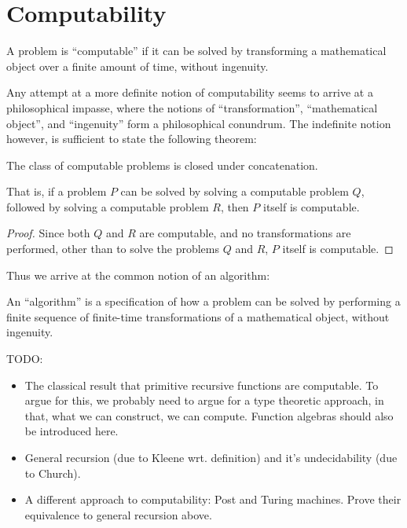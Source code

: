 
\chapter{Computability}

\begin{notion} A problem is ``computable'' if it can be solved by transforming
a mathematical object over a finite amount of time, without ingenuity.
\end{notion}

Any attempt at a more definite notion of computability seems to arrive at a
philosophical impasse, where the notions of ``transformation'', ``mathematical
object'', and ``ingenuity'' form a philosophical conundrum. The indefinite
notion however, is sufficient to state the following theorem:

\begin{theorem} The class of computable problems is closed under
concatenation.\end{theorem}

That is, if a problem $P$ can be solved by solving a computable problem $Q$,
followed by solving a computable problem $R$, then $P$ itself is computable.

\begin{proof} Since both $Q$ and $R$ are computable, and no transformations are
performed, other than to solve the problems $Q$ and $R$, $P$ itself is
computable.\end{proof}

Thus we arrive at the common notion of an algorithm:

\begin{notion} An ``algorithm'' is a specification of how a problem can be
solved by performing a finite sequence of finite-time transformations of a
mathematical object, without ingenuity. \end{notion}

TODO:

\begin{itemize}

\item The classical result that primitive recursive functions are computable.
To argue for this, we probably need to argue for a type theoretic approach, in
that, what we can construct, we can compute. Function algebras should also be
introduced here.

\item General recursion (due to Kleene wrt. definition) and it's undecidability
(due to Church).

\item A different approach to computability: Post and Turing machines. Prove
their equivalence to general recursion above.

\end{itemize}

